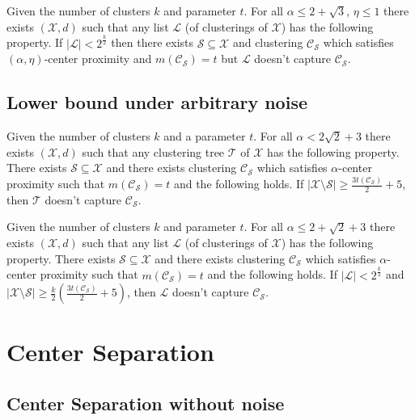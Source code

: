 \documentclass[orivec]{llncs}
\newcommand{\mc}{\mathcal}
\begin{document}
\begin{theorem}
\label{thm:nolistalphacp}
Given the number of clusters $k$ and parameter $t$. For all $\alpha \le 2+\sqrt{3}$, $\eta \le 1$ there exists $(\mc X, d)$ such that any list $\mc L$ (of clusterings of $\mc X$) has  the following property. If $|\mc L| < 2^{\frac{k}{2}}$ then there exists $\mc S \subseteq \mc X$ and clustering $\mc C_{\mc S}$ which satisfies $(\alpha, \eta)$-center proximity and $ m(\mc C_{\mc S}) = t$ but $\mc L$ doesn't capture $\mc C_{\mc S}$.
\end{theorem}

\subsection{Lower bound under arbitrary noise}
\label{section:alphaLowerBoundArbitrary}

\begin{theorem}
\label{thm:nosparsealg}
Given the number of clusters $k$ and a parameter $t$. For all $\alpha < 2\sqrt 2 + 3$ there exists $(\mc X, d)$ such that any clustering tree $\mc T$ of $\mc X$ has the following property. There exists $\mc S \subseteq \mc X$ and there exists clustering $\mc C_{\mc S}$ which satisfies $\alpha$-center proximity such that $m(\mc C_{\mc S}) = t$ and the following holds. If $|\mc X \setminus \mc S| \ge \frac{3t(\mc C_{\mc S})}{2}+5$, then $\mc T$ doesn't capture $\mc C_{\mc S}$.
\end{theorem}

\begin{theorem}
\label{thm:nosparselistalphacp}
Given the number of clusters $k$ and parameter $t$. For all $\alpha \le 2+\sqrt{2}+3$ there exists $(\mc X, d)$ such that any list $\mc L$ (of clusterings of $\mc X$) has  the following property. There exists $\mc S \subseteq \mc X$ and there exists clustering $\mc C_{\mc S}$ which satisfies $\alpha$-center proximity such that $m(\mc C_{\mc S}) = t$ and the following holds. If $|\mc L| < 2^{\frac{k}{2}}$ and $|\mc X \setminus \mc S|\ge \frac{k}{2}(\frac{3t(\mc C_{\mc S})}{2}+5)$, then $\mc L$ doesn't capture $\mc C_{\mc S}$.
\end{theorem}

\section{Center Separation}
\label{sec:cs}
 
\subsection{Center Separation without noise}
\label{sec:cswithout}
\end{document}
